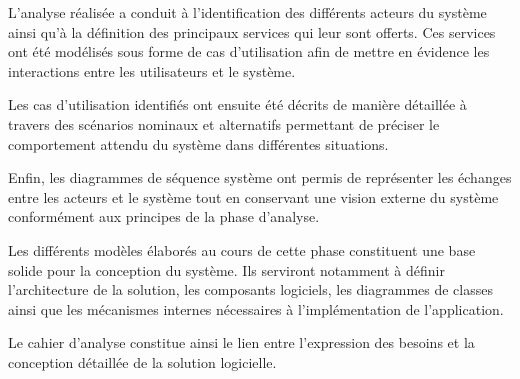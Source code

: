 \documentclass[
]{book}
\begin{document}
L'analyse réalisée a conduit à l'identification des différents acteurs
du système ainsi qu'à la définition des principaux services qui leur
sont offerts. Ces services ont été modélisés sous forme de cas
d'utilisation afin de mettre en évidence les interactions entre les
utilisateurs et le système.

Les cas d'utilisation identifiés ont ensuite été décrits de manière
détaillée à travers des scénarios nominaux et alternatifs permettant de
préciser le comportement attendu du système dans différentes situations.

Enfin, les diagrammes de séquence système ont permis de représenter les
échanges entre les acteurs et le système tout en conservant une vision
externe du système conformément aux principes de la phase d'analyse.

Les différents modèles élaborés au cours de cette phase constituent une
base solide pour la conception du système. Ils serviront notamment à
définir l'architecture de la solution, les composants logiciels, les
diagrammes de classes ainsi que les mécanismes internes nécessaires à
l'implémentation de l'application.

Le cahier d'analyse constitue ainsi le lien entre l'expression des
besoins et la conception détaillée de la solution logicielle.

\backmatter
\end{document}
